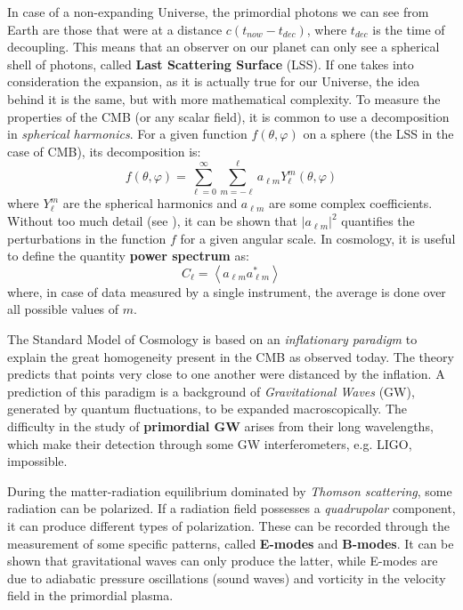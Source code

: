 \documentclass[12pt,a4paper,final]{book}			%
\begin{document}
		In case of a non-expanding Universe, the primordial photons we can see from Earth are those that were at a distance $c(t_{now} - t_{dec})$, where $t_{dec}$ is the time of decoupling.
			 This means that an observer on our planet can only see a spherical shell of photons, called \textbf{Last Scattering Surface} (LSS). 
			 If one takes into consideration the expansion, as it is actually true for our Universe, the idea behind it is the same, but with more mathematical complexity.
			 To measure the properties of the CMB (or any scalar field), it is common to use a decomposition in \textit{spherical harmonics}. For a given function $f(\theta, \varphi)$ on a sphere (the LSS in the case of CMB), its decomposition is:
			\[
				f(\theta, \varphi ) = \sum_{\ell = 0}^{\infty} \sum_{m = -\ell}^{\ell} a_{\ell m} Y^{m}_{\ell} (\theta, \varphi)
			\]
			where $Y^{m}_\ell$ are the spherical harmonics and $a_{\ell m}$ are some complex coefficients. Without too much detail (see \cite{Libro_CMB}), it can be shown that $\left|a_{\ell m }\right|^2$ quantifies the perturbations in the function $f$ for a given angular scale. In cosmology, it is useful to define the quantity \textbf{power spectrum} as:
			\[
				C_{\ell} = \left \langle a_{\ell m } a^*_{\ell m } \right \rangle
			\]
			where, in case of data measured by a single instrument, the average is done over all possible values of $m$.
			 
			 The Standard Model of Cosmology is based on an \textit{inflationary paradigm} to explain the great homogeneity present in the CMB as observed today. The theory predicts that points very close to one another were distanced by the inflation. 
\cite{b_modes_tomasi}
 A prediction of this paradigm is a background of \textit{Gravitational Waves} (GW), generated by quantum fluctuations, to be expanded macroscopically. The difficulty in the study of \textbf{primordial GW} arises from their long wavelengths, which make their detection through some GW interferometers, e.g. LIGO,  impossible.
			 
			During the matter-radiation equilibrium dominated by \textit{Thomson scattering}, some radiation can be polarized. If a radiation field possesses a \textit{quadrupolar} component, it can produce different types of polarization. These can be recorded through the measurement of some specific patterns, called \textbf{E-modes} and \textbf{B-modes}. It can be shown that gravitational waves can only produce the latter, while E-modes are due to adiabatic pressure oscillations (sound waves) and vorticity in the velocity field in the primordial plasma. 
			
\end{document}
